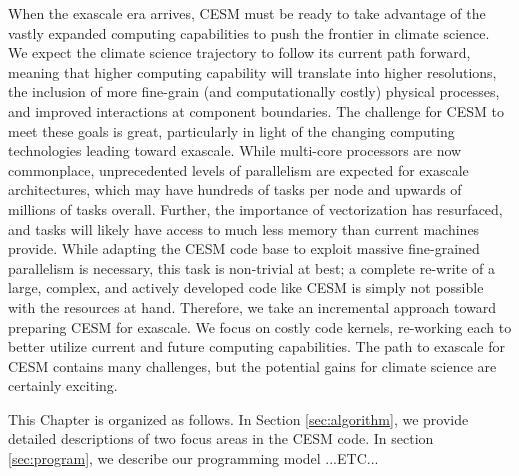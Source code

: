 When the exascale era arrives, CESM must be ready to take advantage of the vastly expanded computing capabilities to push the frontier in climate science.  We expect the climate science trajectory to follow its current path forward, meaning that higher computing capability will translate into higher resolutions, the inclusion of more fine-grain (and computationally costly) physical processes, and improved interactions at component boundaries. The challenge for CESM to meet these goals is great, particularly in light of the changing computing technologies leading toward exascale.  While multi-core processors are now commonplace, unprecedented levels of parallelism are expected for exascale architectures, which may have hundreds of tasks per node and upwards of millions of tasks overall.  Further, the importance of vectorization has resurfaced, and tasks will likely have access to much less memory than current machines provide.  While adapting the CESM code base to exploit massive fine-grained parallelism is necessary, this task is non-trivial at best; a complete re-write of a large, complex, and actively developed code like CESM is simply not possible with the resources at hand.  Therefore, we take an incremental approach toward preparing CESM for exascale. We focus on costly code kernels, re-working each to better utilize current and future computing capabilities.  The path to exascale for CESM contains many challenges, but the potential gains for climate science are certainly exciting.


This Chapter is organized as follows. In Section \ref{sec:algorithm}, we provide detailed descriptions of two focus areas in the CESM code. In section \ref{sec:program},  we describe our programming model ...{\color{red}ETC...}
